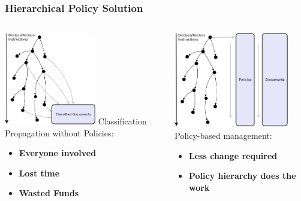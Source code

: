 \documentclass[t,handout, 10pt]{beamer}
\begin{document}
\begin{frame}
\frametitle{Hierarchical Policy Solution}

\begin{columns}[T]
\begin{column}{5cm}
\includegraphics[width=4cm]{hierarchy-1}
\newline
\newline
Classification Propagation without Policies:
\newline
\begin{itemize}
\item \textbf{Everyone involved}
\item \textbf{Lost time}
\item \textbf{Wasted Funds}
\end{itemize}
\end{column}
\begin{column}{5cm}
\includegraphics[width=5cm]{hierarchy-2}
\newline
\newline
Policy-based management:
\newline
\begin{itemize}
\item \textbf{Less change required}
\item \textbf{Policy hierarchy does the work}
\end{itemize}
\end{column}
\end{columns}

\end{frame}
\end{document}
